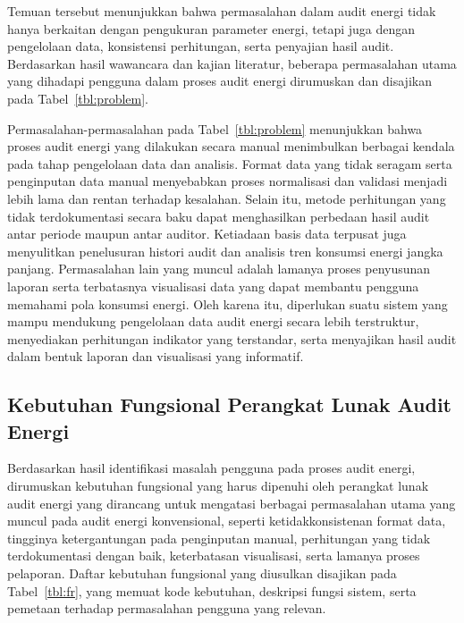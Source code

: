 Temuan tersebut menunjukkan bahwa permasalahan dalam audit energi tidak hanya berkaitan dengan pengukuran parameter energi, tetapi juga dengan pengelolaan data, konsistensi perhitungan, serta penyajian hasil audit. Berdasarkan hasil wawancara dan kajian literatur, beberapa permasalahan utama yang dihadapi pengguna dalam proses audit energi dirumuskan dan disajikan pada Tabel~\ref{tbl:problem}.



Permasalahan-permasalahan pada Tabel~\ref{tbl:problem} menunjukkan bahwa proses audit energi yang dilakukan secara manual menimbulkan berbagai kendala pada tahap pengelolaan data dan analisis. Format data yang tidak seragam serta penginputan data manual menyebabkan proses normalisasi dan validasi menjadi lebih lama dan rentan terhadap kesalahan. Selain itu, metode perhitungan yang tidak terdokumentasi secara baku dapat menghasilkan perbedaan hasil audit antar periode maupun antar auditor. Ketiadaan basis data terpusat juga menyulitkan penelusuran histori audit dan analisis tren konsumsi energi jangka panjang. Permasalahan lain yang muncul adalah lamanya proses penyusunan laporan serta terbatasnya visualisasi data yang dapat membantu pengguna memahami pola konsumsi energi. Oleh karena itu, diperlukan suatu sistem yang mampu mendukung pengelolaan data audit energi secara lebih terstruktur, menyediakan perhitungan indikator yang terstandar, serta menyajikan hasil audit dalam bentuk laporan dan visualisasi yang informatif.

\subsection{Kebutuhan Fungsional Perangkat Lunak Audit Energi}
Berdasarkan hasil identifikasi masalah pengguna pada proses audit energi, dirumuskan kebutuhan fungsional yang harus dipenuhi oleh perangkat lunak audit energi yang dirancang untuk mengatasi berbagai permasalahan utama yang muncul pada audit energi konvensional, seperti ketidakkonsistenan format data, tingginya ketergantungan pada penginputan manual, perhitungan yang tidak terdokumentasi dengan baik, keterbatasan visualisasi, serta lamanya proses pelaporan. Daftar kebutuhan fungsional yang diusulkan disajikan pada Tabel~\ref{tbl:fr}, yang memuat kode kebutuhan, deskripsi fungsi sistem, serta pemetaan terhadap permasalahan pengguna yang relevan.



